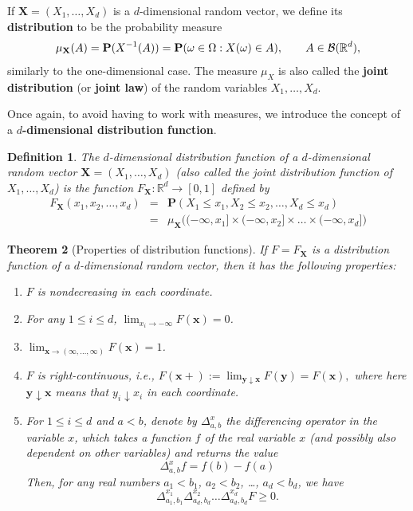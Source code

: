 \documentclass[12pt]{article}
\newtheorem{thm}{Theorem}[section]
\newtheorem{defi}[thm]{Definition}
\newcommand{\R}{\mathbb{R}}
\newcommand{\prob}{\mathbf{P}}
\theoremstyle{example}
\begin{document}
If $\mathbf{X}=(X_1,\ldots,X_d)$ is a $d$-dimensional random vector, we define its \textbf{distribution} to be the probability measure
$$ \mu_{\mathbf{X}}(A) = \prob(X^{-1}(A)) = \prob(\omega \in \Omega : X(\omega) \in A),
\qquad A \in {\cal B}(\R^d), $$
similarly to the one-dimensional case. The measure $\mu_X$ is also called the \textbf{joint distribution} (or \textbf{joint law}) of the random variables $X_1,\ldots,X_d$.

Once again, to avoid having to work with measures, we introduce the concept of a \textbf{$d$-dimensional distribution function}.

\begin{defi} The $d$-dimensional distribution function of a $d$-dimensional random vector $\mathbf{X}=(X_1,\ldots,X_d)$ (also called the joint distribution function of $X_1,\ldots,X_d$) is the function $F_{\mathbf{X}}:\R^d\to[0,1]$ defined by
\begin{eqnarray*}
F_{\mathbf{X}}(x_1,x_2,\ldots,x_d) &=& \prob( X_1 \le x_1, X_2 \le x_2, \ldots, X_d \le x_d)
\\ &=& \mu_{\mathbf{X}}\Big(  (-\infty,x_1] \times (-\infty,x_2]\times \ldots \times (-\infty,x_d]  \Big)
\end{eqnarray*}
\end{defi}

\begin{thm}[Properties of distribution functions]
If $F=F_{\mathbf X}$ is a distribution function of a $d$-dimensional random vector, then it has the following properties:
\renewcommand{\labelenumi}{(\roman{enumi})}
\begin{enumerate}
\item $F$ is nondecreasing in each coordinate.
\item For any $1\le i\le d$, $\lim_{x_i\to-\infty} F(\mathbf{x}) = 0$.
\item $\lim_{\mathbf{x}\to(\infty,\ldots,\infty)} F(\mathbf{x}) = 1$.
\item $F$ is right-continuous, i.e., $F(\mathbf{x}+) := \lim_{\mathbf{y}\downarrow \mathbf{x}} F(\mathbf{y}) = F(\mathbf{x}), $
where here $\mathbf{y}\downarrow \mathbf{x}$ means that $y_i\downarrow x_i$ in each coordinate.
\item For $1\le i\le d$ and $a<b$, denote by
$ \Delta_{a,b}^{x} $
the \emph{differencing operator in the variable $x$}, which takes a function $f$ of the real variable $x$ (and possibly also dependent on other variables) and returns the value
$$ \Delta_{a,b}^{x}f = f(b) - f(a) $$
Then, for any real numbers $a_1 < b_1$, $a_2<b_2$, \ldots, $a_d < b_d$, we have
$$ \Delta^{x_1}_{a_1,b_1} \Delta^{x_2}_{a_d,b_d}
\ldots \Delta^{x_d}_{a_d,b_d} F \ge 0. $$
\end{enumerate}
\label{thm-multidim}
\end{thm}
\end{document}
